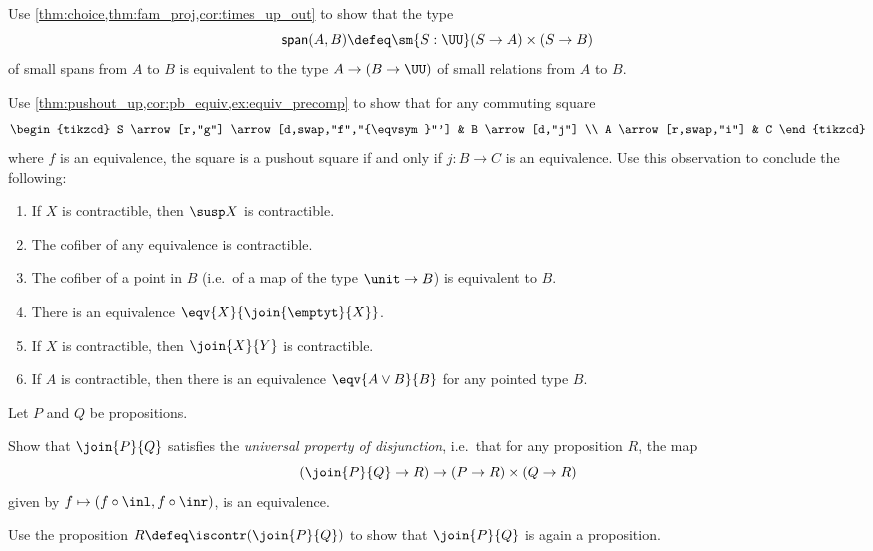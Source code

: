 \begin{exercises}
\item \label{ex:span_rel}Use \cref{thm:choice,thm:fam_proj,cor:times_up_out} to show that the type 
\begin{equation*}
\mathsf{span}(A,B)\defeq \sm{S:\UU} (S\to A)\times (S\to B)
\end{equation*}
of small spans from $A$ to $B$ is equivalent to the type $A\to (B\to\UU)$ of small relations from $A$ to $B$.
\item Use \cref{thm:pushout_up,cor:pb_equiv,ex:equiv_precomp} to show that for any commuting square
\begin{equation*}
\begin{tikzcd}
S \arrow[r,"g"] \arrow[d,swap,"f","{\eqvsym}"'] & B \arrow[d,"j"] \\
A \arrow[r,swap,"i"] & C
\end{tikzcd}
\end{equation*} 
where $f$ is an equivalence, the square is a pushout square if and only if $j:B\to C$ is an equivalence.
Use this observation to conclude the following:
\begin{enumerate}
\item If $X$ is contractible, then $\susp X$ is contractible.
\item The cofiber of any equivalence is contractible.
\item The cofiber of a point in $B$ (i.e.~of a map of the type $\unit\to B$) is equivalent to $B$.
\item There is an equivalence $\eqv{X}{\join{\emptyt}{X}}$.
\item If $X$ is contractible, then $\join{X}{Y}$ is contractible. 
\item If $A$ is contractible, then there is an equivalence $\eqv{A\vee B}{B}$ for any pointed type $B$.
\end{enumerate}
\item Let $P$ and $Q$ be propositions.
\begin{subexenum}
\item Show that $\join{P}{Q}$ satisfies the \emph{universal property of disjunction}, i.e.~that for any proposition $R$, the map
\begin{equation*}
(\join{P}{Q}\to R)\to (P\to R)\times (Q\to R)
\end{equation*}
given by $f\mapsto (f\circ \inl,f\circ \inr)$, is an equivalence.
\item Use the proposition $R\defeq\iscontr(\join{P}{Q})$ to show that $\join{P}{Q}$ is again a proposition.

\end{subexenum}
\end{exercises}
